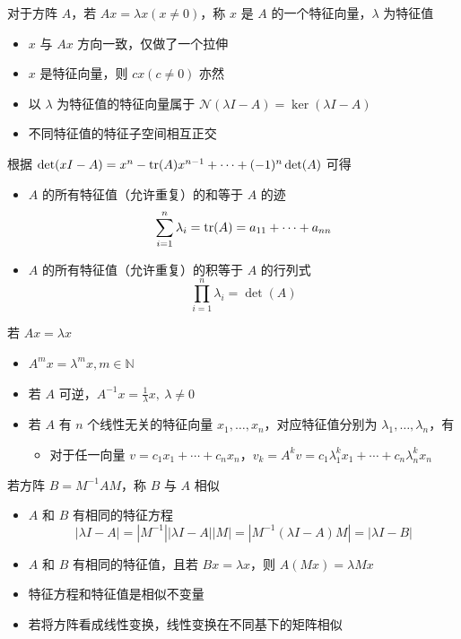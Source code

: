 \begin{remark}
    对于方阵 $A$，若 $Ax = \lambda x(x \neq 0)$，称 $x$ 是 $A$ 的一个特征向量，$\lambda$ 为特征值\begin{itemize}
        \item $x$ 与 $Ax$ 方向一致，仅做了一个拉伸
        \item $x$ 是特征向量，则 $cx(c \neq 0)$ 亦然
        \item 以 $\lambda$ 为特征值的特征向量属于 $\mathcal{N}(\lambda I - A) = \ker(\lambda I - A)$
        \item 不同特征值的特征子空间相互正交
    \end{itemize}
\end{remark}

\begin{remark}
    根据 $\det(xI-A) = x^n - \tr(A)x^{n - 1} + \cdots + (-1)^n\det(A)$ 可得
    \begin{itemize}
        \item $A$ 的所有特征值（允许重复）的和等于 $A$ 的迹 \[\sum_{i = 1}^n \lambda_i = \tr(A) = a_{11} + \cdots + a_{nn}\]
        \item $A$ 的所有特征值（允许重复）的积等于 $A$ 的行列式 \[\prod_{i = 1}^n\lambda_i = \det(A)\]
    \end{itemize}
\end{remark}

\begin{remark}
    若 $Ax = \lambda x$\begin{itemize}
        \item $A^mx = \lambda^m x, m \in \mathbb{N}$
        \item 若 $A$ 可逆，$A^{-1}x = \frac{1}{\lambda}x,\ \lambda \neq 0$
        \item 若 $A$ 有 $n$ 个线性无关的特征向量 $x_1, \dots, x_n$，对应特征值分别为 $\lambda_1, \dots, \lambda_n$，有\begin{itemize}
            \item 对于任一向量 $v = c_1x_1 + \cdots + c_nx_n$，$v_k = A^kv = c_1\lambda_1^kx_1 + \cdots + c_n\lambda_n^kx_n$
        \end{itemize}
    \end{itemize}
\end{remark}

\begin{remark}
    若方阵 $B = M^{-1}AM$，称 $B$ 与 $A$ 相似
    \begin{itemize}
        \item $A$ 和 $B$ 有相同的特征方程 \[|\lambda I - A| = |M^{-1}||\lambda I-A||M| = |M^{-1}(\lambda I - A)M| = |\lambda I - B|\]
        \item $A$ 和 $B$ 有相同的特征值，且若 $Bx = \lambda x$，则 $A(Mx) = \lambda Mx$
        \item 特征方程和特征值是相似不变量
        \item 若将方阵看成线性变换，线性变换在不同基下的矩阵相似
    \end{itemize}
\end{remark}

